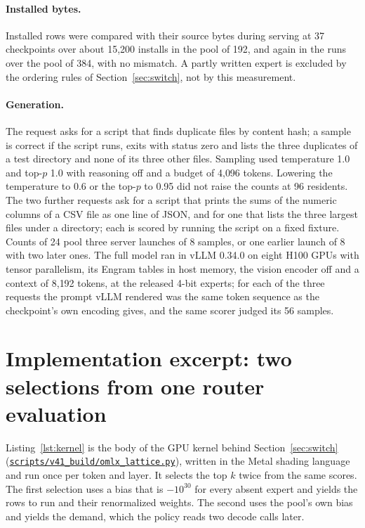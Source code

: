 \documentclass[11pt]{article}
\newcommand{\repo}{https://github.com/jackmaxwil/keep}
\newcommand{\src}[1]{\href{\repo/blob/main/#1}{\nolinkurl{#1}}}
\begin{document}
\paragraph{Installed bytes.} Installed rows were compared with their source bytes during
serving at 37 checkpoints over about 15{,}200 installs in the pool of 192, and again in the runs
over the pool of 384, with no mismatch. A partly written expert is excluded by the ordering
rules of Section~\ref{sec:switch}, not by this measurement.

\paragraph{Generation.} The request asks for a script that finds duplicate files by content
hash; a sample is correct if the script runs, exits with status zero and lists the three duplicates of a test
directory and none of its three other files. Sampling used temperature 1.0 and top-$p$ 1.0 with reasoning off and a budget of
4{,}096 tokens. Lowering the temperature to 0.6 or the top-$p$ to 0.95 did not raise the counts at 96 residents. The two further requests ask for a script that prints the sums of the numeric columns of a CSV file as one line of JSON, and for one that lists the three largest files under a directory; each is scored by running the script on a fixed fixture. Counts of 24 pool three server launches of 8 samples, or one earlier launch of 8 with two later ones. The full model ran in vLLM 0.34.0 on eight H100 GPUs with tensor parallelism, its Engram tables in host memory, the vision encoder off and a context of 8{,}192 tokens, at the released 4-bit experts; for each of the three requests the prompt vLLM rendered was the same token sequence as the checkpoint's own encoding gives, and the same scorer judged its 56 samples.

\FloatBarrier
\section{Implementation excerpt: two selections from one router evaluation}
\label{app:code}

Listing~\ref{lst:kernel} is the body of the GPU kernel behind Section~\ref{sec:switch}
(\src{scripts/v41_build/omlx_lattice.py}), written
in the Metal shading language and run once per token and layer. It selects the top $k$ twice
from the same scores. The first selection uses a bias that is $-10^{30}$ for every absent
expert and yields the rows to run and their renormalized weights. The second uses the pool's
own bias and yields the demand, which the policy reads two decode calls later.
\end{document}
